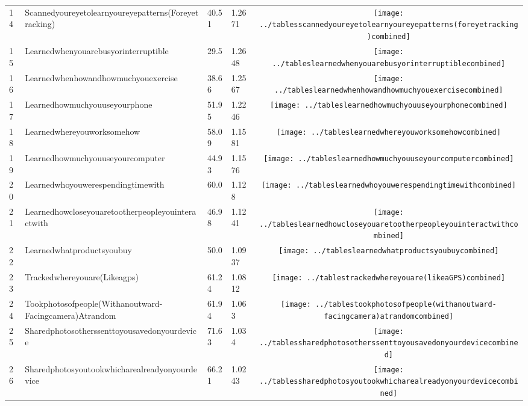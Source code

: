\documentclass[a4paper,12pt]{article}
\begin{document}
\begin{longtable}{| p{0.5cm} | p{7cm} | p{1cm} |p{1cm} | c |}
14 & Scannedyoureyetolearnyoureyepatterns(Foreyetracking) & 40.51 & 1.2671&\texttt{[image: ../tablesscannedyoureyetolearnyoureyepatterns(foreyetracking)combined]} \\ 
15 & Learnedwhenyouarebusyorinterruptible & 29.5 & 1.2648&\texttt{[image: ../tableslearnedwhenyouarebusyorinterruptiblecombined]} \\ 
16 & Learnedwhenhowandhowmuchyouexercise & 38.66 & 1.2567&\texttt{[image: ../tableslearnedwhenhowandhowmuchyouexercisecombined]} \\ 
17 & Learnedhowmuchyouuseyourphone & 51.95 & 1.2246&\texttt{[image: ../tableslearnedhowmuchyouuseyourphonecombined]} \\ 
18 & Learnedwhereyouworksomehow & 58.09 & 1.1581&\texttt{[image: ../tableslearnedwhereyouworksomehowcombined]} \\ 
19 & Learnedhowmuchyouuseyourcomputer & 44.93 & 1.1576&\texttt{[image: ../tableslearnedhowmuchyouuseyourcomputercombined]} \\ 
20 & Learnedwhoyouwerespendingtimewith & 60.0 & 1.128&\texttt{[image: ../tableslearnedwhoyouwerespendingtimewithcombined]} \\ 
21 & Learnedhowcloseyouaretootherpeopleyouinteractwith & 46.98 & 1.1241&\texttt{[image: ../tableslearnedhowcloseyouaretootherpeopleyouinteractwithcombined]} \\ 
22 & Learnedwhatproductsyoubuy & 50.0 & 1.0937&\texttt{[image: ../tableslearnedwhatproductsyoubuycombined]} \\ 
23 & Trackedwhereyouare(Likeagps) & 61.24 & 1.0812&\texttt{[image: ../tablestrackedwhereyouare(likeaGPS)combined]} \\ 
24 & Tookphotosofpeople(Withanoutward-Facingcamera)Atrandom & 61.94 & 1.063&\texttt{[image: ../tablestookphotosofpeople(withanoutward-facingcamera)atrandomcombined]} \\ 
25 & Sharedphotosotherssenttoyousavedonyourdevice & 71.63 & 1.034&\texttt{[image: ../tablessharedphotosotherssenttoyousavedonyourdevicecombined]} \\ 
26 & Sharedphotosyoutookwhicharealreadyonyourdevice & 66.21 & 1.0243&\texttt{[image: ../tablessharedphotosyoutookwhicharealreadyonyourdevicecombined]} \\ 

\end{longtable}
\end{document}
